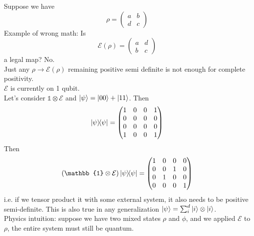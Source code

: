 \begin{example}
    Suppose we have 
    \begin{equation}
        \rho = \begin{pmatrix}
            a & b \\ d & c
        \end{pmatrix}
    \end{equation}
    Example of wrong math: Is 
    \begin{equation}
        \mathcal{E}(\rho) = \begin{pmatrix}
            a & d \\ b & c
        \end{pmatrix}
    \end{equation}
    a legal map? No.\\
    Just any $\rho \rightarrow \mathcal{E}(\rho)$ remaining positive semi definite is not enough for complete positivity. \\
    $\mathcal{E}$ is currently on 1 qubit. \\
    Let's consider $ \mathbb{1} \otimes \mathcal{E}$ and $\ket{\psi} = \ket{00} + \ket{11}$. Then 
    \begin{equation}
        \ketbra{\psi} = \begin{pmatrix}
            1 & 0 & 0 & 1 \\
            0 & 0 & 0 & 0 \\
            0 & 0 & 0 & 0 \\
            1 & 0 & 0 & 1 
        \end{pmatrix}
    \end{equation}
    Then
    \begin{equation}
        (\mathbb{1} \otimes \mathcal{E}) \ketbra{\psi} = \begin{pmatrix}
            1 & 0 & 0 & 0 \\
            0 & 0 & 1 & 0 \\
            0 & 1 & 0 & 0 \\
            0 & 0 & 0 & 1 
        \end{pmatrix}
    \end{equation}
    i.e. if we tensor product it with some external system, it also needs to be positive semi-definite. This is also true in any generalization $\ket{\psi}= \sum_i^d \ket{i}\otimes \ket{i}$. \\ 
    Physics intuition: suppose we have two mixed states $\rho$ and $\phi$, and we applied $\mathcal{E}$ to $\rho$, the entire system must still be quantum. 
\end{example}

